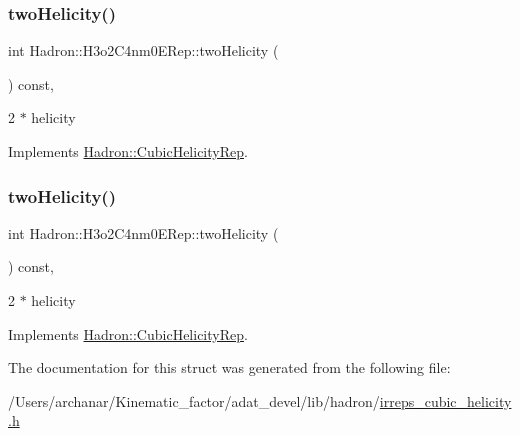 \subsubsection{\texorpdfstring{twoHelicity()}{twoHelicity()}\hspace{0.1cm}{\footnotesize\ttfamily [1/2]}}
{\footnotesize\ttfamily int Hadron\+::\+H3o2\+C4nm0\+E\+Rep\+::two\+Helicity (\begin{DoxyParamCaption}{ }\end{DoxyParamCaption}) const\hspace{0.3cm}{\ttfamily [inline]}, {\ttfamily [virtual]}}

2 $\ast$ helicity 

Implements \mbox{\hyperlink{structHadron_1_1CubicHelicityRep_af507aa56fc2747eacc8cb6c96db31ecc}{Hadron\+::\+Cubic\+Helicity\+Rep}}.

\mbox{\label{structHadron_1_1H3o2C4nm0ERep_a02b0a0895d49ca7a0dd5aa6cdacc877e}} 
\subsubsection{\texorpdfstring{twoHelicity()}{twoHelicity()}\hspace{0.1cm}{\footnotesize\ttfamily [2/2]}}
{\footnotesize\ttfamily int Hadron\+::\+H3o2\+C4nm0\+E\+Rep\+::two\+Helicity (\begin{DoxyParamCaption}{ }\end{DoxyParamCaption}) const\hspace{0.3cm}{\ttfamily [inline]}, {\ttfamily [virtual]}}

2 $\ast$ helicity 

Implements \mbox{\hyperlink{structHadron_1_1CubicHelicityRep_af507aa56fc2747eacc8cb6c96db31ecc}{Hadron\+::\+Cubic\+Helicity\+Rep}}.



The documentation for this struct was generated from the following file\+:\begin{DoxyCompactItemize}
\item 
/\+Users/archanar/\+Kinematic\+\_\+factor/adat\+\_\+devel/lib/hadron/\mbox{\hyperlink{lib_2hadron_2irreps__cubic__helicity_8h}{irreps\+\_\+cubic\+\_\+helicity.\+h}}\end{DoxyCompactItemize}
